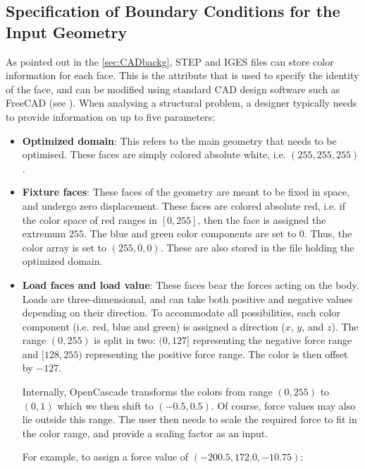 \subsection{Specification of Boundary Conditions for the Input Geometry}
\label{sec: GeomCreation}

As pointed out in the \ref{sec:CADbackg}, STEP and IGES files can store color information for each face. This is the attribute that is used to specify the identity of the face, and can be modified using standard CAD design software such as FreeCAD (see \cite{FreeCAD}). When analysing a structural problem, a designer typically needs to provide information on up to five parameters:

\begin{itemize}
	\item \textbf{Optimized domain}: This refers to the main geometry that needs to be optimised. These faces are simply colored absolute white, i.e. $(255, 255, 255)$.
	\item \textbf{Fixture faces}: These faces of the geometry are meant to be fixed in space, and undergo zero displacement. These faces are colored absolute red, i.e. if the color space of red ranges in {$[0, 255]$}, then the face is assigned the extremum $255$. The blue and green color components are set to $0$. Thus, the color array is set to $(255, 0, 0)$. These are also stored in the file holding the optimized domain.
	\item \textbf{Load faces and load value}: These faces bear the forces acting on the body. Loads are three-dimensional, and can take both positive and negative values depending on their direction. To accommodate all possibilities, each color component (i.e. red, blue and green) is assigned a direction ($x$, $y$, and $z$). The range $(0, 255)$ is split in two: $(0, 127]$ representing the negative force range and $[128, 255)$ representing the positive force range. The color is then offset by $-127$. 

Internally, OpenCascade transforms the colors from range $(0, 255)$ to $(0,1)$ which we then shift to $(-0.5, 0.5)$. Of course, force values may also lie outside this range. The user then needs to scale the required force to fit in the color range, and provide a scaling factor as an input.

For example, to assign a force value of $(-200.5, 172.0, -10.75)$:



\end{itemize}
